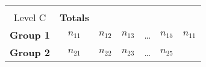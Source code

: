 \documentclass[]{book}
\theoremstyle{definition}
\theoremstyle{definition}
\theoremstyle{remark}
\begin{document}
\begin{longtable}[]{@{}ccccccc@{}}
\begin{minipage}[b]{0.14\columnwidth}
\textbf{Response\\
Level C}\strut
\end{minipage} & \begin{minipage}[b]{0.14\columnwidth}\centering\strut
\textbf{Totals}\strut
\end{minipage}\tabularnewline
\midrule
\endhead
\begin{minipage}[t]{0.06\columnwidth}\centering\strut
\textbf{Group 1}\strut
\end{minipage} & \begin{minipage}[t]{0.14\columnwidth}\centering\strut
\(n_{11}\)\strut
\end{minipage} & \begin{minipage}[t]{0.14\columnwidth}\centering\strut
\(n_{12}\)\strut
\end{minipage} & \begin{minipage}[t]{0.14\columnwidth}\centering\strut
\(n_{13}\)\strut
\end{minipage} & \begin{minipage}[t]{0.05\columnwidth}\centering\strut
\ldots{}\strut
\end{minipage} & \begin{minipage}[t]{0.14\columnwidth}\centering\strut
\(n_{15}\)\strut
\end{minipage} & \begin{minipage}[t]{0.14\columnwidth}\centering\strut
\(n_{11}\)\strut
\end{minipage}\tabularnewline
\begin{minipage}[t]{0.06\columnwidth}\centering\strut
\textbf{Group 2}\strut
\end{minipage} & \begin{minipage}[t]{0.14\columnwidth}\centering\strut
\(n_{21}\)\strut
\end{minipage} & \begin{minipage}[t]{0.14\columnwidth}\centering\strut
\(n_{22}\)\strut
\end{minipage} & \begin{minipage}[t]{0.14\columnwidth}\centering\strut
\(n_{23}\)\strut
\end{minipage} & \begin{minipage}[t]{0.05\columnwidth}\centering\strut
\ldots{}\strut
\end{minipage} & \begin{minipage}[t]{0.14\columnwidth}\centering\strut
\(n_{25}\)\strut
\end{minipage} & \begin{minipage}[t]{0.14\columnwidth}\centering\strut

\end{minipage}
\end{longtable}
\end{document}
